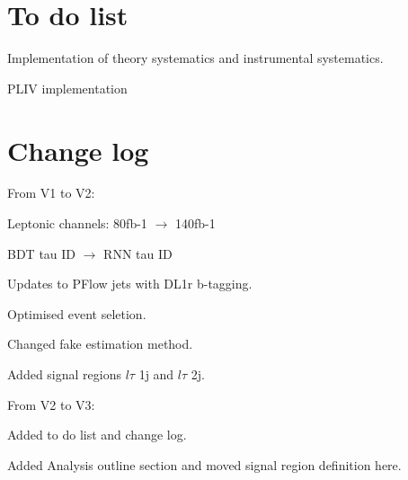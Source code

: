 \section{To do list}

Implementation of theory systematics and instrumental systematics.

PLIV implementation

\section{Change log}

From V1 to V2:

Leptonic channels:  80fb-1 $\to$ 140fb-1

BDT tau ID $\to$ RNN tau ID

Updates to PFlow jets with DL1r b-tagging.

Optimised event seletion.

Changed fake estimation method.

Added signal regions $l\tau$ 1j and $l\tau$ 2j.

From V2 to V3:

Added to do list and change log.

Added Analysis outline section and moved signal region definition here.

